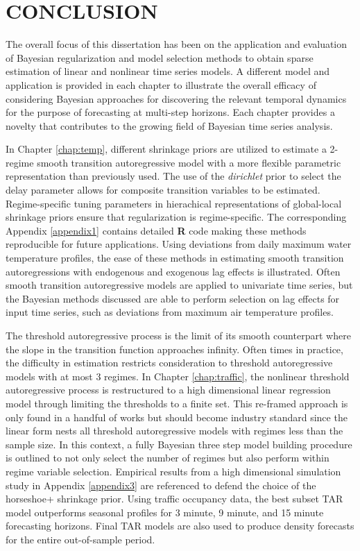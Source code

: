 \chapter{CONCLUSION}
The overall focus of this dissertation has been on the application and evaluation of Bayesian regularization and model selection methods to obtain sparse estimation of linear and nonlinear time series models. A different model and application is provided in each chapter to illustrate the overall efficacy of considering Bayesian approaches for discovering the relevant temporal dynamics for the purpose of forecasting at multi-step horizons. Each chapter provides a novelty that contributes to the growing field of Bayesian time series analysis. 

In Chapter \ref{chap:temp}, different shrinkage priors are utilized to estimate a 2-regime smooth transition autoregressive model with a more flexible parametric representation than previously used. The use of the \textit{dirichlet} prior to select the delay parameter allows for composite transition variables to be estimated. Regime-specific tuning parameters in hierachical representations of global-local shrinkage priors ensure that regularization is regime-specific. The corresponding Appendix \ref{appendix1} contains detailed \textbf{R} code making these methods reproducible for future applications. Using deviations from daily maximum water temperature profiles, the ease of these methods in estimating smooth transition autoregressions with endogenous and exogenous lag effects is illustrated. Often smooth transition autoregressive models are applied to univariate time series, but the Bayesian methods discussed are able to perform selection on lag effects for input time series, such as deviations from maximum air temperature profiles.

The threshold autoregressive process is the limit of its smooth counterpart where the slope in the transition function approaches infinity. Often times in practice, the difficulty in estimation restricts consideration to threshold autoregressive models with at most 3 regimes. In Chapter \ref{chap:traffic}, the nonlinear threshold autoregressive process is restructured to a high dimensional linear regression model through limiting the thresholds to a finite set. This re-framed approach is only found in a handful of works but should become industry standard since the linear form nests all threshold autoregressive models with regimes less than the sample size. In this context, a fully Bayesian three step model building procedure is outlined to not only select the number of regimes but also perform within regime variable selection. Empirical results from a high dimensional simulation study in Appendix \ref{appendix3} are referenced to defend the choice of the horseshoe+ shrinkage prior. Using traffic occupancy data, the best subset TAR model outperforms seasonal profiles for 3 minute, 9 minute, and 15 minute forecasting horizons. Final TAR models are also used to produce density forecasts for the entire out-of-sample period. 

